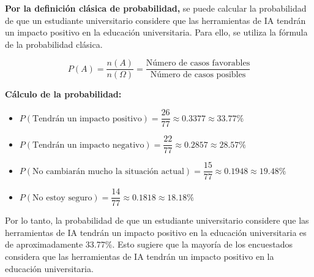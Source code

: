 \textbf{Por la definición clásica de probabilidad,} se puede calcular la probabilidad de que un estudiante universitario considere que las herramientas de IA tendrán un impacto positivo en la educación universitaria. Para ello, se utiliza la fórmula de la probabilidad clásica.

\begin{equation*}
  P(A) = \dfrac{n(A)}{n(\Omega)} = \dfrac{\text{Número de casos favorables}}{\text{Número de casos posibles}}
\end{equation*}

\textbf{Cálculo de la probabilidad:}

\begin{itemize}
  \item $P(\text{Tendrán un impacto positivo}) = \dfrac{26}{77} \approx 0.3377 \approx 33.77\%$
  \item $P(\text{Tendrán un impacto negativo}) = \dfrac{22}{77} \approx 0.2857 \approx 28.57\%$
  \item $P(\text{No cambiarán mucho la situación actual}) = \dfrac{15}{77} \approx 0.1948 \approx 19.48\%$
  \item $P(\text{No estoy seguro}) = \dfrac{14}{77} \approx 0.1818 \approx 18.18\%$
\end{itemize}

Por lo tanto, la probabilidad de que un estudiante universitario considere que las herramientas de IA tendrán un impacto positivo en la educación universitaria es de aproximadamente 33.77\%. Esto sugiere que la mayoría de los encuestados considera que las herramientas de IA tendrán un impacto positivo en la educación universitaria.